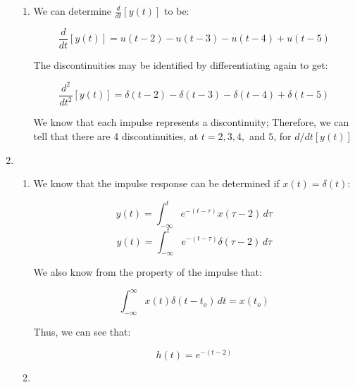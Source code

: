 \begin{enumerate}
\begin{enumerate}
      \item 

        We can determine $\frac{d}{dt}[y(t)]$ to be:

        $$\frac{d}{dt}[y(t)]=u(t-2)-u(t-3)-u(t-4)+u(t-5)$$

        The discontinuities may be identified by differentiating again to get:

        $$\frac{d^2}{dt^2}[y(t)]=\delta(t-2)-\delta(t-3)-\delta(t-4)+\delta(t-5)$$

        We know that each impulse represents a discontinuity; Therefore, we can tell that there are 4 discontinuities, at $t=2,3,4,$ and $5$, for $d/dt[y(t)]$

    \end{enumerate}

  \item

    \begin{enumerate}

      \item 

        We know that the impulse response can be determined if $x(t)=\delta(t)$:

        $$y(t)=\int_{-\infty}^{t}e^{-(t-\tau)}x(\tau-2)\,d\tau$$
        $$y(t)=\int_{-\infty}^{t}e^{-(t-\tau)}\delta(\tau-2)\,d\tau$$

        We also know from the property of the impulse that:

        $$\int_{-\infty}^{\infty} x(t)\delta(t-t_o)\,dt=x(t_o)$$

        Thus, we can see that:

        $$\boxed{h(t)=e^{-(t-2)}}$$

      \item 

    \end{enumerate}

\end{enumerate}



